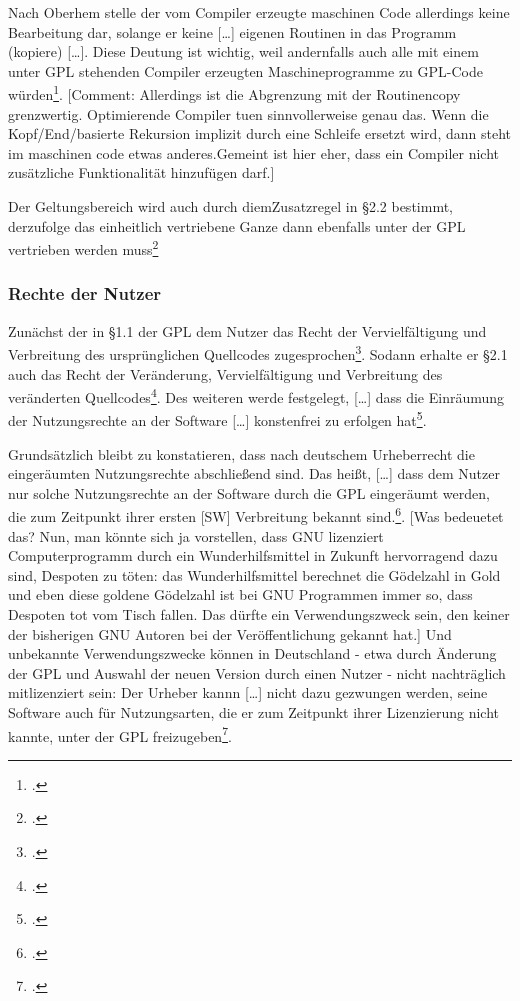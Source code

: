 \documentclass[DIV=calc,BCOR=5mm,11pt,headings=small,oneside,abstract=true, toc=bib]{scrartcl}
\begin{document}
Nach Oberhem stelle der vom Compiler erzeugte maschinen Code allerdings keine
Bearbeitung dar, solange er keine \glqq{}[\ldots] eigenen Routinen in das
Programm (kopiere) [\ldots]\grqq{}. Diese Deutung ist wichtig, weil andernfalls
auch alle mit einem unter GPL stehenden Compiler erzeugten Maschineprogramme zu
GPL-Code würden\footcite[vgl.][36]{Oberhem2008a}. [Comment: Allerdings ist die
Abgrenzung mit der Routinencopy grenzwertig. Optimierende Compiler tuen
sinnvollerweise genau das. Wenn die Kopf/End/basierte Rekursion implizit durch
eine Schleife ersetzt wird, dann steht im maschinen code etwas anderes.Gemeint
ist hier eher, dass ein Compiler nicht zusätzliche Funktionalität hinzufügen
darf.]

Der Geltungsbereich wird auch durch diemZusatzregel in §2.2 bestimmt, derzufolge
das einheitlich vertriebene Ganze dann ebenfalls unter der GPL vertrieben werden
muss\footcite[vgl.][37]{Oberhem2008a}

\subsubsection{Rechte der Nutzer}

Zunächst der in §1.1 der GPL dem Nutzer das Recht der
\glqq{}Vervielfältigung und Verbreitung des ursprünglichen Quellcodes\grqq{}
zugesprochen\footcite[vgl.][38]{Oberhem2008a}. Sodann erhalte er §2.1 auch das
Recht der \glqq{}Veränderung, Vervielfältigung und Verbreitung des veränderten
Quellcodes\grqq{}\footcite[vgl.][39]{Oberhem2008a}. Des weiteren werde
festgelegt, \glqq{}[\ldots] dass die Einräumung der Nutzungsrechte an der
Software [\ldots] konstenfrei zu erfolgen
hat\grqq{}\footcite[vgl.][41]{Oberhem2008a}.

Grundsätzlich bleibt zu konstatieren, dass nach deutschem Urheberrecht die
eingeräumten Nutzungsrechte abschließend sind. Das heißt, \glqq{}[\ldots]
dass dem Nutzer nur solche Nutzungsrechte an der Software durch die GPL
eingeräumt werden, die zum Zeitpunkt ihrer ersten [SW] Verbreitung bekannt
sind\grqq{}.\footcite[vgl.][41]{Oberhem2008a}. [Was bedeuetet das? Nun, man
könnte sich ja vorstellen, dass GNU lizenziert Computerprogramm durch ein
Wunderhilfsmittel in Zukunft hervorragend dazu sind, Despoten zu töten: das
Wunderhilfsmittel berechnet die Gödelzahl in Gold und eben diese
goldene Gödelzahl ist bei GNU Programmen immer so, dass Despoten tot vom Tisch
fallen. Das dürfte ein Verwendungszweck sein, den keiner der bisherigen GNU
Autoren bei der Veröffentlichung gekannt hat.]  Und unbekannte Verwendungszwecke
können in Deutschland - etwa durch Änderung der GPL und Auswahl der neuen
Version durch einen Nutzer - nicht nachträglich mitlizenziert sein:
\glqq{}Der Urheber kannn [\ldots] nicht dazu gezwungen werden, seine
Software auch für Nutzungsarten, die er zum Zeitpunkt ihrer Lizenzierung
nicht kannte, unter der GPL freizugeben\grqq{}\footcite[vgl.][43]{Oberhem2008a}.
\end{document}
